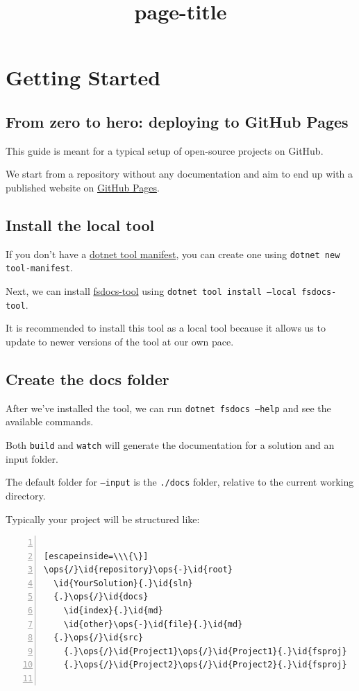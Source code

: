 \documentclass{article}
\title{{page-title}}
\date{}
\newcommand{\id}[1]{\textcolor{black}{#1}}
\newcommand{\ops}[1]{\textcolor{purple}{#1}}
\begin{document}
\maketitle


\section*{Getting Started}

\subsection*{From zero to hero: deploying to GitHub Pages}



This guide is meant for a typical setup of open-source projects on GitHub.

We start from a repository without any documentation and aim to end up with a published website on \href{https://pages.github.com/}{GitHub Pages}.
\subsection*{Install the local tool}



If you don't have a \href{https://learn.microsoft.com/en-us/dotnet/core/tools/local-tools-how-to-use\#create-a-manifest-file}{dotnet tool manifest}, you can create one using \texttt{dotnet new tool-manifest}.


Next, we can install \href{https://www.nuget.org/packages/fsdocs-tool/}{fsdocs-tool} using \texttt{dotnet tool install --local fsdocs-tool}.

It is recommended to install this tool as a local tool because it allows us to update to newer versions of the tool at our own pace.
\subsection*{Create the docs folder}



After we've installed the tool, we can run \texttt{dotnet fsdocs --help} and see the available commands.

Both \texttt{build} and \texttt{watch} will generate the documentation for a solution and an input folder.

The default folder for \texttt{--input} is the \texttt{./docs} folder, relative to the current working directory.


Typically your project will be structured like:
\begin{lstlisting}[numbers=left]

[escapeinside=\\\{\}]
\ops{/}\id{repository}\ops{-}\id{root}
  \id{YourSolution}{.}\id{sln}
  {.}\ops{/}\id{docs}
    \id{index}{.}\id{md}
    \id{other}\ops{-}\id{file}{.}\id{md}
  {.}\ops{/}\id{src}
    {.}\ops{/}\id{Project1}\ops{/}\id{Project1}{.}\id{fsproj}
    {.}\ops{/}\id{Project2}\ops{/}\id{Project2}{.}\id{fsproj}


\end{lstlisting}
\end{document}
